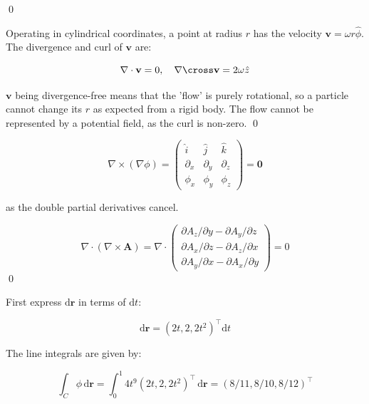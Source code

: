 \documentclass[12pt]{article}
\begin{document}
\qed


Operating in cylindrical coordinates, a point at radius $r$ has the velocity $\mathbf{v} = \omega r \hat{\phi}$. The divergence and curl of $\mathbf{v}$ are:

\begin{equation}
    \nabla \cdot \mathbf{v} = 0, \quad \nabla \cross \mathbf{v} = 2\omega \hat{z}
\end{equation}

$\mathbf{v}$ being divergence-free means that the 'flow' is purely rotational, so a particle cannot change its $r$ as expected from a rigid body. The flow cannot be represented by a potential field, as the curl is non-zero.
\qed



\begin{equation}
    \nabla \times (\nabla \phi)
    =
    \begin{pmatrix}
        \hat{i} & \hat{j} & \hat{k} \\
        \partial_{x} & \partial_{y} & \partial_{z} \\
        \phi_{x} & \phi_{y} & \phi_{z}
    \end{pmatrix}
    =
    \mathbf{0}
\end{equation}

as the double partial derivatives cancel.

\begin{equation}
    \nabla \cdot (\nabla \times \mathbf{A})
    =
    \nabla \cdot \begin{pmatrix}
        \partial A_{z}/\partial y - \partial A_{y}/\partial z  \\
        \partial A_{x}/\partial z - \partial A_{z}/\partial x  \\
        \partial A_{y}/\partial x - \partial A_{x}/\partial y
    \end{pmatrix}
    = 0
\end{equation}
\qed


First express $\mathrm{d}\mathbf{r}$ in terms of $\mathrm{d}t$:

\begin{equation}
    \mathrm{d}\mathbf{r} = (2t, 2, 2t^{2})^{\intercal} \mathrm{d}t
\end{equation}

The line integrals are given by:

\begin{equation}
    \int_{C} \phi \, \mathrm{d}\mathbf{r} = \int_{0}^{1} 4t^{9} (2t, 2, 2t^{2})^{\intercal} \, \mathrm{d}\mathbf{r} = (8/11, 8/10, 8/12)^{\intercal}
\end{equation}
\end{document}
